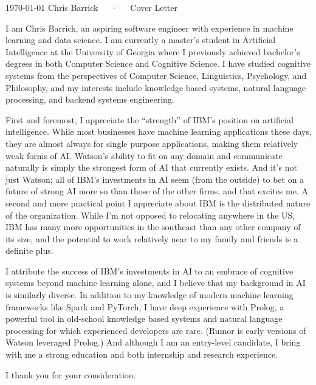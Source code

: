 \documentclass[11pt, letterpaper]{awesome-cv}
\begin{document}
\makecvheader[C]

\makecvfooter
  {\today}
  {Chris Barrick~~~·~~~Cover Letter}
  {\thepage}

\makelettertitle

\begin{cvletter}

I am Chris Barrick, an aspiring software engineer with experience in machine learning and data science. I am currently a master's student in Artificial Intelligence at the University of Georgia where I previously achieved bachelor's degrees in both Computer Science and Cognitive Science. I have studied cognitive systems from the perspectives of Computer Science, Linguistics, Psychology, and Philosophy, and my interests include knowledge based systems, natural language processing, and backend systems engineering.

First and foremost, I appreciate the ``strength'' of IBM's position on artificial intelligence. While most businesses have machine learning applications these days, they are almost always for single purpose applications, making them relatively weak forms of AI. Watson's ability to fit on any domain and communicate naturally is simply the strongest form of AI that currently exists. And it's not just Watson; all of IBM's investments in AI seem (from the outside) to bet on a future of strong AI more so than those of the other firms, and that excites me. A second and more practical point I appreciate about IBM is the distributed nature of the organization. While I'm not opposed to relocating anywhere in the US, IBM has many more opportunities in the southeast than any other company of its size, and the potential to work relatively near to my family and friends is a definite plus.

I attribute the success of IBM's investments in AI to an embrace of cognitive systems beyond machine learning alone, and I believe that my background in AI is similarly diverse. In addition to my knowledge of modern machine learning frameworks like Spark and PyTorch, I have deep experience with Prolog, a powerful tool in old-school knowledge based systems and natural language processing for which experienced developers are rare. (Rumor is early versions of Watson leveraged Prolog.) And although I am an entry-level candidate, I bring with me a strong education and both internship and research experience.

I thank you for your consideration.

\end{cvletter}


\makeletterclosing
\end{document}
